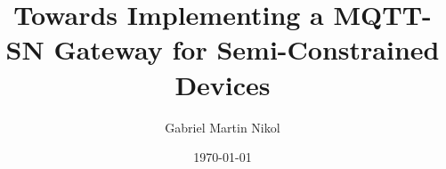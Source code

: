\author{Gabriel Martin Nikol}
\title{Towards Implementing a MQTT-SN Gateway for Semi-Constrained Devices}
\date{\today}

\newlanguagecommand{\semester}

\newcommand{\supervisor}{Prof. Dr. Udo Krieger}


